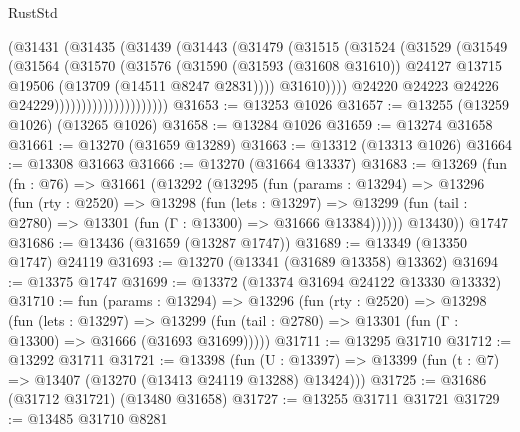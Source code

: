 \begin{lexlean}{RustStd}
\begin{coremodule}
                                (@31431
                                  (@31435
                                    (@31439
                                      (@31443
                                        (@31479
                                          (@31515
                                            (@31524
                                              (@31529
                                                (@31549
                                                  (@31564
                                                    (@31570
                                                      (@31576
                                                        (@31590
                                                          (@31593 (@31608 @31610))
                                                          @24127
                                                          @13715
                                                          @19506
                                                          (@13709 (@14511 @8247 @2831))))
                                                      @31610))))
                                              @24220
                                              @24223
                                              @24226
                                              @24229)))))))))))))))))))))
@31653 := @13253 @1026
@31657 := @13255 (@13259 @1026) (@13265 @1026)
@31658 := @13284 @1026
@31659 := @13274 @31658
@31661 := @13270 (@31659 @13289)
@31663 := @13312 (@13313 @1026)
@31664 := @13308 @31663
@31666 := @13270 (@31664 @13337)
@31683 := @13269
    (fun (fn : @76) =>
    @31661
      (@13292
        (@13295
          (fun (params : @13294) =>
          @13296
            (fun (rty : @2520) =>
            @13298
              (fun (lets : @13297) =>
              @13299 (fun (tail : @2780) => @13301 (fun (Γ : @13300) => @31666 @13384))))))
        @13430))
    @1747
@31686 := @13436 (@31659 (@13287 @1747))
@31689 := @13349 (@13350 @1747) @24119
@31693 := @13270 (@13341 (@31689 @13358) @13362)
@31694 := @13375 @1747
@31699 := @13372 (@13374 @31694 @24122 @13330 @13332)
@31710 := fun (params : @13294) =>
  @13296
    (fun (rty : @2520) =>
    @13298
      (fun (lets : @13297) =>
      @13299 (fun (tail : @2780) => @13301 (fun (Γ : @13300) => @31666 (@31693 @31699)))))
@31711 := @13295 @31710
@31712 := @13292 @31711
@31721 := @13398
    (fun (U : @13397) => @13399 (fun (t : @7) => @13407 (@13270 (@13413 @24119 @13288) @13424)))
@31725 := @31686 (@31712 @31721) (@13480 @31658)
@31727 := @13255 @31711 @31721
@31729 := @13485 @31710 @8281

\end{coremodule}
\end{lexlean}
